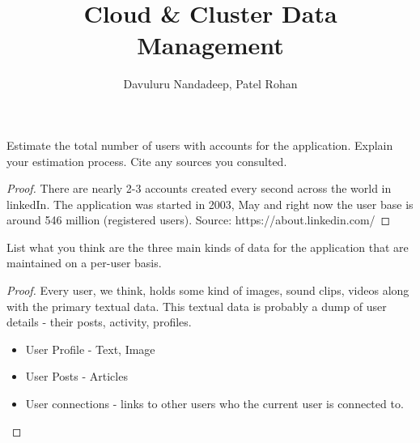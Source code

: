 \documentclass[12pt]{article}
\newenvironment{problem}[2][Problem]{\begin{trivlist}
\item[\hskip \labelsep {\bfseries #1}\hskip \labelsep {\bfseries #2.}]}{\end{trivlist}}
\begin{document}
 

 
\title{Cloud \& Cluster Data Management}
\author{Davuluru Nandadeep, Patel Rohan}
\maketitle
 
\begin{problem}{1}
Estimate the total number of users with accounts for the application. Explain your estimation process. Cite any sources you consulted.
\end{problem}
 
\begin{proof}
There are nearly 2-3 accounts created every second across the world in linkedIn. The application was started in 2003, May and right now the user base is around 546 million (registered users). Source: https://about.linkedin.com/

\end{proof}

\begin{problem}{2}
List what you think are the three main kinds of data for the application that are maintained on a per-user basis.
\end{problem}
 
\begin{proof}
Every user, we think, holds some kind of images, sound clips, videos along with the primary textual data. This textual data is probably a dump of user details - their posts, activity, profiles. 
\begin{itemize}
\item User Profile - Text, Image
\item User Posts -  Articles
\item User connections - links to other users who the current user is connected to.
\end{itemize}

\end{proof}
\end{document}
